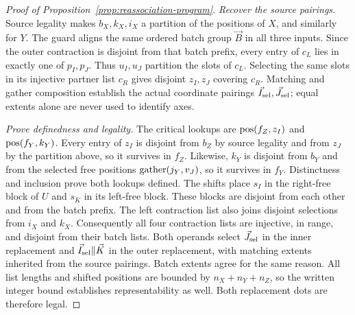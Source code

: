 \label{app:reassociation-proof}
\begin{proof}[Proof of Proposition~\ref{prop:reassociation-program}]
\emph{Recover the source pairings.}
Source legality makes $b_X,k_X,i_X$ a partition of the positions of $X$,
and similarly for $Y$. The guard aligns the same ordered batch group $\vec B$
in all three inputs. Since the outer contraction is disjoint from that
batch prefix, every entry of $c_L$ lies in exactly one of $p_I,p_J$.
Thus $u_I,u_J$ partition the slots of $c_L$. Selecting the same slots
in its injective partner list $c_R$ gives disjoint $z_I,z_J$ covering
$c_R$. Matching and gather composition establish the actual coordinate
pairings $\vec I_{\mathrm{sel}},\vec J_{\mathrm{sel}}$; equal extents alone are never used to identify axes.

\emph{Prove definedness and legality.}
The critical lookups are $\operatorname{pos}(f_Z,z_I)$ and $\operatorname{pos}(f_Y,k_Y)$.
Every entry of $z_I$ is disjoint from $b_Z$ by source legality and from
$z_J$ by the partition above, so it survives in $f_Z$.
Likewise, $k_Y$ is disjoint from $b_Y$ and from the selected free positions
$\operatorname{gather}(j_Y,v_J)$, so it survives in $f_Y$. Distinctness and inclusion
prove both lookups defined. The shifts place $s_I$ in the right-free block
of $U$ and $s_K$ in its left-free block. These blocks are disjoint from
each other and from the batch prefix. The left contraction list also
joins disjoint selections from $i_X$ and $k_X$. Consequently all four
contraction lists are injective, in range, and disjoint from their batch
lists. Both operands select $\vec J_{\mathrm{sel}}$ in the inner replacement and
$\vec I_{\mathrm{sel}}\Vert \vec K$ in the outer replacement, with matching extents inherited
from the source pairings. Batch extents agree for the same reason.
All list lengths and shifted positions are bounded by $n_X+n_Y+n_Z$,
so the written integer bound establishes representability as well.
Both replacement dots are therefore legal.


\end{proof}
